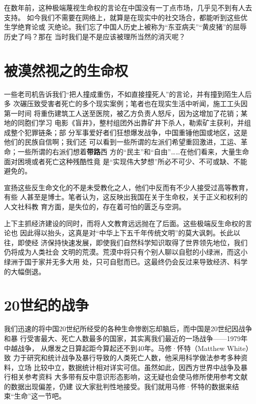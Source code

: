 在数年前，这种极端蔑视生命权的言论在中国没有一丁点市场，几乎见不到有人去支持。
如今我们不需要在网络上，就算是在现实中的社交场合，都能听到这些优生学绝育论或
灭绝论。我们忘了中国人历史上被称为“东亚病夫”“黄皮猪”的屈辱历史了吗？那在
当时我们是不是应该被理所当然的消灭呢？

\section{被漠然视之的生命权}

一些老司机告诉我们“把人撞成重伤，不如直接撞死人”的言论，并有撞到陌生人后多
次碾压致受害者死亡的多个现实案例；笔者也在现实生活中听闻，施工工头因第一时间
将重伤建筑工人送至医院，被乙方负责人怒斥，因为这增加了花销；某地的同胞们学习
电影《盲井》，整村组团外出靠矿井下杀人，勒索矿主获利，并组成整个犯罪链条；部
分军事爱好者们狂想爆发战争，中国重锤他国或地区，这是他们的民族自信啊；我们还
可以看到一些所谓的左派们希望重回激进，工运、革命；一些所谓的右派们想着\textbf{带路}西
方的“民主”和“自由”……在他们看来，大量生命面对困境或者死亡这种残酷性竟
是“实现伟大梦想”所必不可少、不可或缺、不能避免的。

宣扬这些反生命文化的不是未受教化之人，他们中反而有不少人接受过高等教育，有些
人甚至是博士。笔者认为，这反映出我国在关于生命权，关于正义和权利的人文社科教
育方面，是失位的，存在着可怕的匮乏与空洞。

上下主抓经济建设的同时，而将人文教育远远抛在了后面。这些极端反生命权的言论也
因此得以抬头，这真是对“中华上下五千年传统文明”的莫大讽刺。长此以往，即使经
济保持快速发展，即使我们自然科学知识取得了世界领先地位，我们仍将成为人类社会
文明的荒漠。荒漠中将只有个别人聊以自慰的小绿洲，而这小绿洲于国于家并无多大用
处，只可自慰而已。这最终仍会反过来导致经济、科学的大幅倒退。

\section{20世纪的战争}

我们迅速的将中国20世纪所经受的各种生命惨剧忘却脑后，而中国是20世纪因战争和暴
行受害最大、死亡人数最多的国家，其实离我们最近的一场战争——1979年中越战争，
从爆发之日算起距今算起还不到40年。马修·怀特（Matthew White）\cite{mattwhite}致
力于研究和统计战争及暴行导致的人类死亡人数，他采用科学做法参考多种资料，立场
比较中立，数据统计相对详实可信。虽然如此，因西方世界中战争及暴行相关参考资料
大多带有反中意识形态影响，这无疑也会使马修所使用参考文献的数据出现偏差，仍建
议大家批判性地接受。我们就用马修·怀特的数据来结束“生命”这一节吧。

